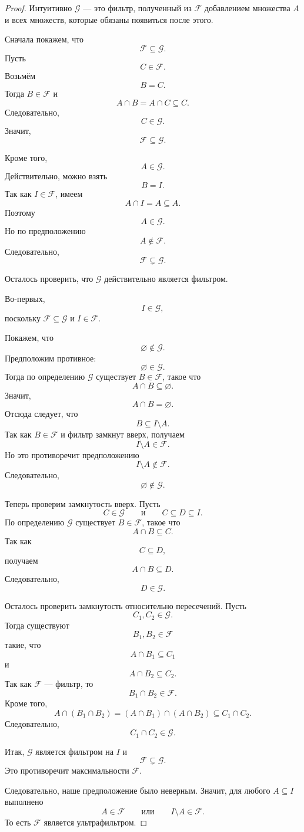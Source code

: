 \documentclass[12pt,a4paper,oneside,openany]{book}
\theoremstyle{definition}
\theoremstyle{plain}
\theoremstyle{remark}
\begin{document}
\begin{proof}
Интуитивно $\mathcal G$ — это фильтр, полученный из $\mathcal F$ добавлением множества $A$ и всех множеств, которые обязаны появиться после этого.

Сначала покажем, что
\[
\mathcal F\subseteq\mathcal G.
\]
Пусть
\[
C\in\mathcal F.
\]
Возьмём
\[
B=C.
\]
Тогда $B\in\mathcal F$ и
\[
A\cap B=A\cap C\subseteq C.
\]
Следовательно,
\[
C\in\mathcal G.
\]
Значит,
\[
\mathcal F\subseteq\mathcal G.
\]

Кроме того,
\[
A\in\mathcal G.
\]
Действительно, можно взять
\[
B=I.
\]
Так как $I\in\mathcal F$, имеем
\[
A\cap I=A\subseteq A.
\]
Поэтому
\[
A\in\mathcal G.
\]
Но по предположению
\[
A\notin\mathcal F.
\]
Следовательно,
\[
\mathcal F\subsetneq\mathcal G.
\]

Осталось проверить, что $\mathcal G$ действительно является фильтром.

Во-первых,
\[
I\in\mathcal G,
\]
поскольку $\mathcal F\subseteq\mathcal G$ и $I\in\mathcal F$.

Покажем, что
\[
\varnothing\notin\mathcal G.
\]
Предположим противное:
\[
\varnothing\in\mathcal G.
\]
Тогда по определению $\mathcal G$ существует $B\in\mathcal F$, такое что
\[
A\cap B\subseteq\varnothing.
\]
Значит,
\[
A\cap B=\varnothing.
\]
Отсюда следует, что
\[
B\subseteq I\setminus A.
\]
Так как $B\in\mathcal F$ и фильтр замкнут вверх, получаем
\[
I\setminus A\in\mathcal F.
\]
Но это противоречит предположению
\[
I\setminus A\notin\mathcal F.
\]
Следовательно,
\[
\varnothing\notin\mathcal G.
\]

Теперь проверим замкнутость вверх. Пусть
\[
C\in\mathcal G
\qquad
\text{и}
\qquad
C\subseteq D\subseteq I.
\]
По определению $\mathcal G$ существует $B\in\mathcal F$, такое что
\[
A\cap B\subseteq C.
\]
Так как
\[
C\subseteq D,
\]
получаем
\[
A\cap B\subseteq D.
\]
Следовательно,
\[
D\in\mathcal G.
\]

Осталось проверить замкнутость относительно пересечений. Пусть
\[
C_1,C_2\in\mathcal G.
\]
Тогда существуют
\[
B_1,B_2\in\mathcal F
\]
такие, что
\[
A\cap B_1\subseteq C_1
\]
и
\[
A\cap B_2\subseteq C_2.
\]
Так как $\mathcal F$ — фильтр, то
\[
B_1\cap B_2\in\mathcal F.
\]
Кроме того,
\[
A\cap(B_1\cap B_2)
=
(A\cap B_1)\cap(A\cap B_2)
\subseteq C_1\cap C_2.
\]
Следовательно,
\[
C_1\cap C_2\in\mathcal G.
\]

Итак, $\mathcal G$ является фильтром на $I$ и
\[
\mathcal F\subsetneq\mathcal G.
\]
Это противоречит максимальности $\mathcal F$.

Следовательно, наше предположение было неверным. Значит, для любого $A\subseteq I$ выполнено
\[
A\in\mathcal F
\qquad
\text{или}
\qquad
I\setminus A\in\mathcal F.
\]
То есть $\mathcal F$ является ультрафильтром.
\end{proof}
\end{document}
